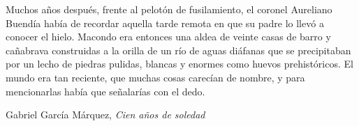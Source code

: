 \vspace*{5cm}
\epigraph{Muchos años después, frente al pelotón de fusilamiento, el coronel Aureliano Buendía hab\'ia de recordar aquella tarde remota en que su padre lo llevó a conocer el hielo. Macondo era entonces una aldea de veinte casas de barro y cañabrava construidas a la orilla de un r\'io de aguas di\'afanas que se precipitaban por un lecho de piedras pulidas, blancas y enormes como huevos prehist\'oricos. El mundo era tan reciente, que muchas cosas carecían de nombre, y para mencionarlas hab\'ia que señalarías con el dedo.}{Gabriel Garc\'ia M\'arquez, \textit{Cien a\~nos de soledad}}
\vfill
\pagebreak
